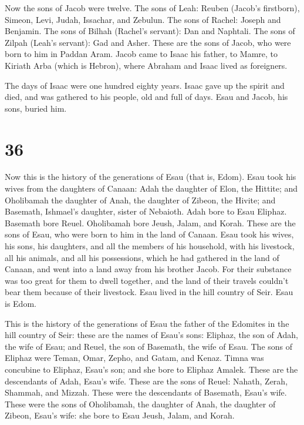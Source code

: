 Now the sons of Jacob were twelve.  The sons of Leah:
Reuben (Jacob's firstborn), Simeon, Levi, Judah, Issachar, and Zebulun.
 The sons of Rachel: Joseph and Benjamin. 
The sons of Bilhah (Rachel's servant): Dan and Naphtali. 
The sons of Zilpah (Leah's servant): Gad and Asher. These are the sons
of Jacob, who were born to him in Paddan Aram.  Jacob
came to Isaac his father, to Mamre, to Kiriath Arba (which is Hebron),
where Abraham and Isaac lived as foreigners.

 The days of Isaac were one hundred eighty years.
 Isaac gave up the spirit and died, and was gathered to
his people, old and full of days. Esau and Jacob, his sons, buried him.

\hypertarget{section-35}{%
\section{36}\label{section-35}}

 Now this is the history of the generations of Esau (that
is, Edom).  Esau took his wives from the daughters of
Canaan: Adah the daughter of Elon, the Hittite; and Oholibamah the
daughter of Anah, the daughter of Zibeon, the Hivite;  and
Basemath, Ishmael's daughter, sister of Nebaioth.  Adah
bore to Esau Eliphaz. Basemath bore Reuel.  Oholibamah
bore Jeush, Jalam, and Korah. These are the sons of Esau, who were born
to him in the land of Canaan.  Esau took his wives, his
sons, his daughters, and all the members of his household, with his
livestock, all his animals, and all his possessions, which he had
gathered in the land of Canaan, and went into a land away from his
brother Jacob.  For their substance was too great for them
to dwell together, and the land of their travels couldn't bear them
because of their livestock.  Esau lived in the hill
country of Seir. Esau is Edom.

 This is the history of the generations of Esau the father
of the Edomites in the hill country of Seir:  these are
the names of Esau's sons: Eliphaz, the son of Adah, the wife of Esau;
and Reuel, the son of Basemath, the wife of Esau.  The
sons of Eliphaz were Teman, Omar, Zepho, and Gatam, and Kenaz.
 Timna was concubine to Eliphaz, Esau's son; and she bore
to Eliphaz Amalek. These are the descendants of Adah, Esau's wife.
 These are the sons of Reuel: Nahath, Zerah, Shammah, and
Mizzah. These were the descendants of Basemath, Esau's wife.
 These were the sons of Oholibamah, the daughter of Anah,
the daughter of Zibeon, Esau's wife: she bore to Esau Jeush, Jalam, and
Korah.

